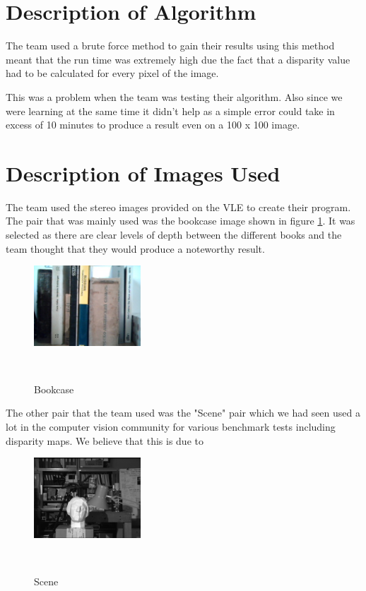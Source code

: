 \documentclass[twocolumn]{article}
\begin{document}
\section{Description of Algorithm}
\vspace{-1ex}

The team used a brute force method to gain their results using this method meant that the run time was extremely high due the fact that a disparity value had to be calculated for every pixel of the image. 

This was a problem when the team was testing their algorithm. Also since we were learning at the same time it didn't help as a simple error could take in excess of 10 minutes to produce a result even on a 100 x 100 image. 




\section{Description of Images Used}
\vspace{-1ex}

The team used the stereo images provided on the VLE to create their program. The pair that was mainly used was the bookcase image shown in figure \ref{fig:testR}. It was selected as there are clear levels of depth between the different books and the team thought that they would produce a noteworthy result. 

\begin{figure}[H]
\centering
  \includegraphics[width=40mm]{Figures/testR}
    \caption{Bookcase}~\label{fig:testR}
\end{figure} 

The other pair that the team used was the "Scene" pair which we had seen used a lot in the computer vision community \cite{sceneusage} \cite{sceneusage2} for various benchmark tests including disparity maps. We believe that this is due to %

\begin{figure}[H]
\centering
  \includegraphics[width=40mm]{Figures/scene}
    \caption{Scene}~\label{fig:scene}
\end{figure} 
\end{document}
